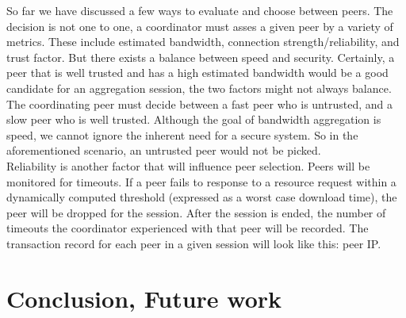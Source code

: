 \documentclass[12pt]{article}
\begin{document}
			So far we have discussed a few ways to evaluate and choose between peers. The decision is not one to one, a coordinator must asses a given peer by a variety of metrics. These include estimated bandwidth, connection strength/reliability, and trust factor. But there exists a balance between speed and security. Certainly, a peer that is well trusted and has a high estimated bandwidth would be a good candidate for an aggregation session, the two factors might not always balance. The coordinating peer must decide between a fast peer who is untrusted, and a slow peer who is well trusted. Although the goal of bandwidth aggregation is speed, we cannot ignore the inherent need for a secure system. So in the aforementioned scenario, an untrusted peer would not be picked. \\

			Reliability is another factor that will influence peer selection. Peers will be monitored for timeouts. If a peer fails to response to a resource request within a dynamically computed threshold (expressed as a worst case download time), the peer will be dropped for the session. After the session is ended, the number of timeouts the coordinator experienced with that peer will be recorded. The transaction record for each peer in a given session will look like this:
				peer IP.









\section{Conclusion, Future work}


\listoftodos
\end{document}
